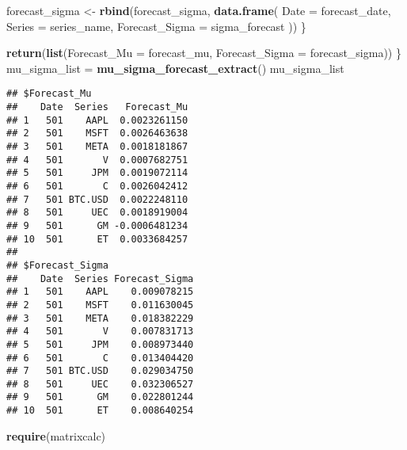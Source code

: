 \documentclass[
]{article}
\newenvironment{Shaded}{\begin{snugshade}}{\end{snugshade}}
\newcommand{\AttributeTok}[1]{\textcolor[rgb]{0.13,0.29,0.53}{#1}}
\newcommand{\FunctionTok}[1]{\textcolor[rgb]{0.13,0.29,0.53}{\textbf{#1}}}
\newcommand{\NormalTok}[1]{#1}
\newcommand{\OtherTok}[1]{\textcolor[rgb]{0.56,0.35,0.01}{#1}}
\newcommand{\SpecialCharTok}[1]{\textcolor[rgb]{0.81,0.36,0.00}{\textbf{#1}}}
\begin{document}
\begin{Shaded}
\begin{Highlighting}[]
\NormalTok{    forecast\_sigma }\OtherTok{\textless{}{-}} \FunctionTok{rbind}\NormalTok{(forecast\_sigma, }\FunctionTok{data.frame}\NormalTok{(}
      \AttributeTok{Date =}\NormalTok{ forecast\_date,}
      \AttributeTok{Series =}\NormalTok{ series\_name,}
      \AttributeTok{Forecast\_Sigma =}\NormalTok{ sigma\_forecast}
\NormalTok{    ))}
\NormalTok{  \}}
  
  \FunctionTok{return}\NormalTok{(}\FunctionTok{list}\NormalTok{(}\AttributeTok{Forecast\_Mu =}\NormalTok{ forecast\_mu, }\AttributeTok{Forecast\_Sigma =}\NormalTok{ forecast\_sigma))}
\NormalTok{\}}
\NormalTok{mu\_sigma\_list }\OtherTok{=} \FunctionTok{mu\_sigma\_forecast\_extract}\NormalTok{()}
\NormalTok{mu\_sigma\_list}
\end{Highlighting}
\end{Shaded}

\begin{verbatim}
## $Forecast_Mu
##    Date  Series   Forecast_Mu
## 1   501    AAPL  0.0023261150
## 2   501    MSFT  0.0026463638
## 3   501    META  0.0018181867
## 4   501       V  0.0007682751
## 5   501     JPM  0.0019072114
## 6   501       C  0.0026042412
## 7   501 BTC.USD  0.0022248110
## 8   501     UEC  0.0018919004
## 9   501      GM -0.0006481234
## 10  501      ET  0.0033684257
## 
## $Forecast_Sigma
##    Date  Series Forecast_Sigma
## 1   501    AAPL    0.009078215
## 2   501    MSFT    0.011630045
## 3   501    META    0.018382229
## 4   501       V    0.007831713
## 5   501     JPM    0.008973440
## 6   501       C    0.013404420
## 7   501 BTC.USD    0.029034750
## 8   501     UEC    0.032306527
## 9   501      GM    0.022801244
## 10  501      ET    0.008640254
\end{verbatim}

\begin{Shaded}
\end{Shaded}

\begin{Shaded}
\begin{Highlighting}[]
\FunctionTok{require}\NormalTok{(matrixcalc)}
\end{Highlighting}
\end{Shaded}
\end{document}
